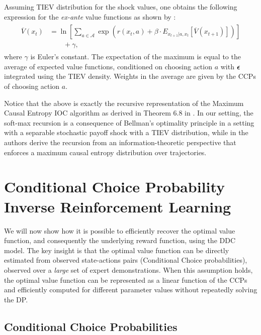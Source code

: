 \documentclass{article}
\renewcommand{\vec}[1]{\mbox{\bm{$#1$}}}
\begin{document}
Assuming TIEV distribution for the shock values, one obtains the following expression for the \emph{ex-ante} value functions as shown by \cite{rust_gmc}:
\begin{align} \label{eq:exanterust}
\begin{split}
\overline{V}(x_t) &=\ln\left[\sum_{a\in\mathcal{A}} \exp\left(r(x_t,a)+\beta \cdot E_{x_{t+1}|a,x_t} \left[ \overline{V}(x_{t+1}) \right] \right)\right] \\
& \qquad +\gamma,
\end{split}
\end{align}
where $\gamma$ is Euler's constant. The expectation of the maximum is equal to the average of expected value functions, conditioned on choosing action $a$ with $\vec{\epsilon}$ integrated using the TIEV density. Weights in the average are given by the CCPs of choosing action $a$.


Notice that the above is exactly the recursive representation of the Maximum Causal Entropy IOC algorithm as derived in Theorem 6.8 in \cite{ziebart_phd}. In our setting, the soft-max recursion is a consequence of Bellman's optimality principle in a setting with a separable stochastic payoff shock with a TIEV distribution, while in \cite{ziebart_phd} the authors derive the recursion from an information-theoretic perspective that enforces a maximum causal entropy distribution over trajectories.


\section{Conditional Choice Probability Inverse Reinforcement Learning}

We will now show how it is possible to efficiently recover the optimal value function, and consequently the underlying reward function, using the DDC model. The key insight is that the optimal value function can be directly estimated from observed state-actions pairs (Conditional Choice probabilities), observed over a \textit{large} set of expert demonstrations. When this assumption holds, the optimal value function can be represented as a linear function of the CCPs and efficiently computed for different parameter values without repeatedly solving the DP.

\subsection{Conditional Choice Probabilities}
\end{document}
